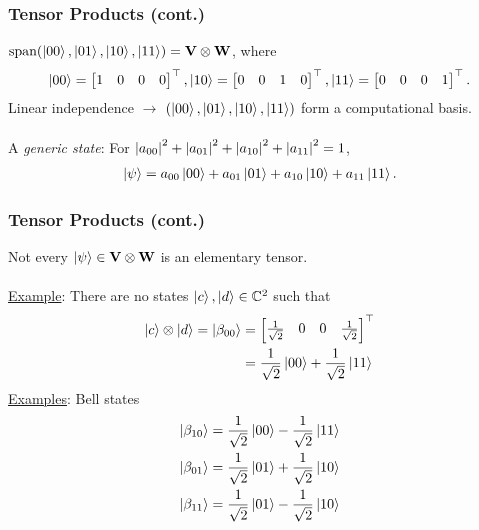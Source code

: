 \documentclass{beamer}
\theoremstyle{definition}
\newcommand{\V}{\mathbf{V}}
\newcommand{\W}{\mathbf{W}}
\newcommand{\xpan}{\text{span}}
\begin{document}
\begin{frame}
\frametitle{Tensor Products (cont.)}

$\xpan(\ket{00}, \ket{01}, \ket{10}, \ket{11}) = \V\otimes \W$, where
\begin{align*}
\left\vert{00}\right\rangle = \begin{bmatrix}
1&0&0&0
\end{bmatrix}^\top, \left\vert{10}\right\rangle = \begin{bmatrix}
0&0&1&0
\end{bmatrix}^\top, \left\vert{11}\right\rangle = \begin{bmatrix}
0&0&0&1
\end{bmatrix}^\top.
\end{align*}
Linear independence $\rightarrow$ $(\left\vert{00}\right\rangle, \left\vert{01}\right\rangle, \left\vert{10}\right\rangle, \left\vert{11}\right\rangle)$ form a computational basis. \\
$\,$\\
A \textit{generic state}: For $\abs{a_{00}}^2 + \abs{a_{01}}^2 + \abs{a_{10}}^2 + \abs{a_{11}}^2 = 1$,
\begin{align*}
\left\vert{\psi}\right\rangle = a_{00}\left\vert{00}\right\rangle + a_{01}\left\vert{01}\right\rangle + a_{10}\left\vert{10}\right\rangle + a_{11}\left\vert{11}\right\rangle.
\end{align*}

\end{frame}


\begin{frame}
\frametitle{Tensor Products (cont.)}
Not every $\ket{\psi} \in \V\otimes \W$ is an elementary tensor. \\
$\,$\\
\underline{Example}: There are no states $\left\vert{c}\right\rangle, \left\vert{d}\right\rangle \in \mathbb{C}^2$ such that
\begin{align*}
\left\vert{c}\right\rangle \otimes \left\vert{d}\right\rangle = \left\vert{\beta_{00}}\right\rangle &= \begin{bmatrix}
\frac{1}{\sqrt{2}} & 0 & 0 & \frac{1}{\sqrt{2}}
\end{bmatrix}^\top \\
&= \frac{1}{\sqrt{2}}\left\vert{00}\right\rangle + \frac{1}{\sqrt{2}}\left\vert{11}\right\rangle
\end{align*}
\underline{Examples}: Bell states
\begin{align*}
\left\vert{\beta_{10}}\right\rangle = \frac{1}{\sqrt{2}}\left\vert{00}\right\rangle - \frac{1}{\sqrt{2}}\left\vert{11}\right\rangle\\
\left\vert{\beta_{01}}\right\rangle = \frac{1}{\sqrt{2}}\left\vert{01}\right\rangle + \frac{1}{\sqrt{2}}\left\vert{10}\right\rangle\\
\left\vert{\beta_{11}}\right\rangle = \frac{1}{\sqrt{2}}\left\vert{01}\right\rangle - \frac{1}{\sqrt{2}}\left\vert{10}\right\rangle\\
\end{align*}
\end{frame}
\end{document}
